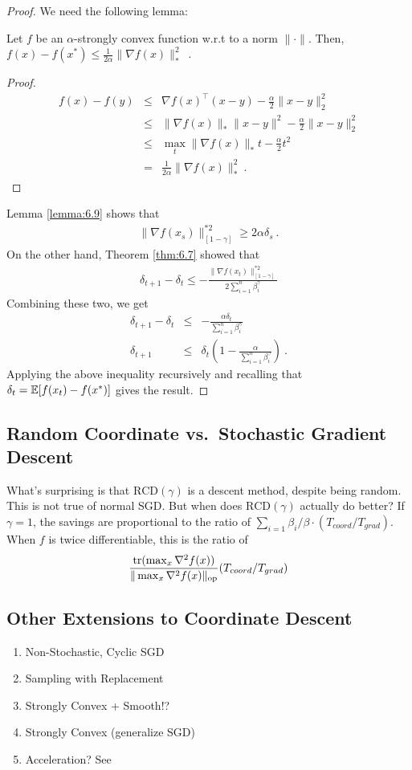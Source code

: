 	\begin{proof} We need the following lemma:
  \begin{lemma}
    \label{lemma:6.9} 
    Let $f$ be an $\alpha$-strongly convex function w.r.t to a norm
    $\|\cdot\|$. Then, $f(x) - f(x^*) \le \frac{1}{2\alpha} \|\nabla
    f(x)\|_*^2$\ .
	 \end{lemma}
	 \begin{proof}
	 \begin{eqnarray*}
     f(x) - f(y)
     &\le& \nabla f(x)^\top (x -y ) - \frac{\alpha}{2}\|x - y\|^2_2\\
	   &\le& \|\nabla f(x)\|_* \|x - y\|^2 - \frac{\alpha}{2}\|x - y\|^2_2\\
	   &\le& \max_t \|\nabla f(x)\|_* t - \frac{\alpha}{2}t^2\\
	 	 &=&  \frac{1}{2\alpha} \|\nabla f(x)\|_*^2 \ .
	 \end{eqnarray*}
	 \end{proof}

   Lemma \ref{lemma:6.9} shows that 
	 \begin{eqnarray*}
     \|\nabla f(x_s)\|^{*2}_{[1-\gamma]}
     \ge 2 \alpha \delta_s \ .
	 \end{eqnarray*}
   On the other hand, Theorem \ref{thm:6.7} showed that
   \begin{eqnarray}
   \delta_{t+1} - \delta_t \le -\frac{\|\nabla f(x_t)\|^{*2}_{[1-\gamma]}}{2\sum_{i=1}^n \beta_i^{\gamma}} 
   \end{eqnarray}
   Combining these two, we get
	 \begin{eqnarray}
     \delta_{t+1} - \delta_t &\le& -\frac{\alpha \delta_t}{\sum_{i=1}^n \beta_i^{\gamma}}  \\
     \delta_{t+1} &\le&  \delta_t \left(1  -\frac{\alpha}{\sum_{i=1}^n \beta_i^{\gamma}} \right)~.
	 \end{eqnarray}
   Applying the above inequality recursively and recalling that
   $\delta_t = \operatorname*{\mathbb{E}}[f(x_t) - f(x^*)]$ gives the result.

	\end{proof}

	\subsection{Random Coordinate vs.\ Stochastic Gradient Descent}
	What's surprising is that $\mathrm{RCD}(\gamma)$ is a descent method, despite being random. This is not true of normal SGD. 
	But when does $\mathrm{RCD}(\gamma)$ actually do better? If $\gamma = 1$, the savings are proportional to the ratio of $\sum_{i=1} \beta_i / \beta \cdot (T_{coord}/T_{grad})$. When $f$ is twice differentiable, this is the ratio of 
	\begin{eqnarray}
	\frac{\mathrm{tr}(\max_{x} \nabla^2 f(x))}{\|\max_{x} \nabla^2 f(x)\|_{\mathrm{op}}} (T_{coord}/T_{grad})
	\end{eqnarray}
	\subsection{Other Extensions to Coordinate Descent}
	\begin{enumerate}
		\item Non-Stochastic, Cyclic SGD
		\item Sampling with Replacement
		\item Strongly Convex + Smooth!?
		\item Strongly Convex (generalize SGD)
		\item Acceleration? See \cite{tu2017breaking}
	\end{enumerate}
